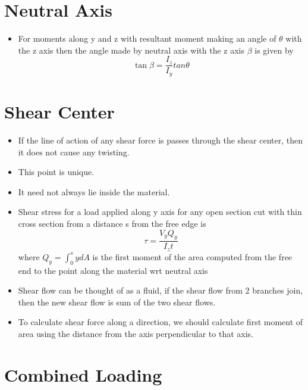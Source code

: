 \documentclass{article}
\begin{document}
\pagebreak

\section{Neutral Axis}
	\begin{itemize}
		\item For moments along y and z with resultant moment making an angle of $\theta$ with the z axis then the angle made by neutral axis with the z axis $\beta$ is given by
		\[ \tan \beta = \frac{I_z}{I_y} tan\theta\]




	\end{itemize}

\section{Shear Center}
	\begin{itemize}
		\item If the line of action of any shear force is passes through the shear center, then it does not cause any twisting. 
		\item This point is unique.
		\item It need not always lie inside the material.
		\item Shear stress for a load applied along y axis for any open section cut with thin cross section from a distance s from the free edge is 
		\[\tau = \frac{V_yQ_y}{I_zt}\]
		where $Q_y = \int_0^s y dA$ is the first moment of the area computed from the free end to the point along the material wrt neutral axis

		\item Shear flow can be thought of as a fluid, if the shear flow from 2 branches join, then the new shear flow is sum of the two shear flows.
		\item To calculate shear force along a direction, we should calculate first moment of area using the distance from the axis perpendicular to that axis.


	\end{itemize}

\section{Combined Loading}
\end{document}
